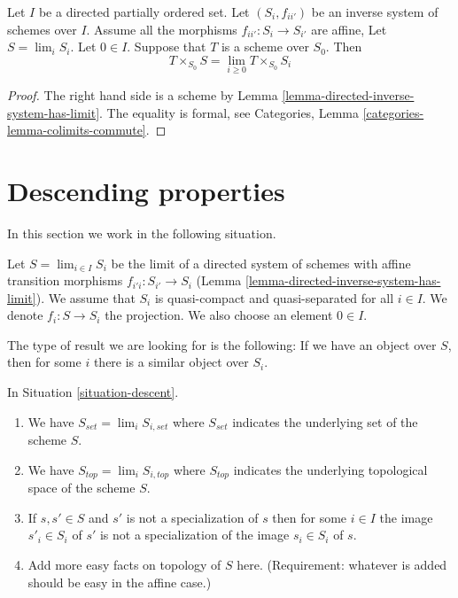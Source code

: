\begin{lemma}
\label{lemma-scheme-over-limit}
Let $I$ be a directed partially ordered set.
Let $(S_i, f_{ii'})$ be an inverse system of schemes over $I$.
Assume all the morphisms $f_{ii'} : S_i \to S_{i'}$ are affine,
Let $S = \lim_i S_i$. Let $0 \in I$.
Suppose that $T$ is a scheme over $S_0$.
Then
$$
T \times_{S_0} S = \lim_{i \geq 0} T \times_{S_0} S_i
$$
\end{lemma}

\begin{proof}
The right hand side is a scheme by
Lemma \ref{lemma-directed-inverse-system-has-limit}.
The equality is formal, see
Categories, Lemma \ref{categories-lemma-colimits-commute}.
\end{proof}







\section{Descending properties}
\label{section-descent}

\noindent
In this section we work in the following situation.

\begin{situation}
\label{situation-descent}
Let $S = \lim_{i \in I} S_i$ be the limit of a directed system of schemes
with affine transition morphisms $f_{i'i} : S_{i'} \to S_i$
(Lemma \ref{lemma-directed-inverse-system-has-limit}).
We assume that $S_i$ is quasi-compact and quasi-separated for all $i \in I$.
We denote $f_i : S \to S_i$ the projection.
We also choose an element $0 \in I$.
\end{situation}

\noindent
The type of result we are looking for is the following:
If we have an object over $S$, then for some $i$ there is a
similar object over $S_i$.

\begin{lemma}
\label{lemma-topology-limit}
In Situation \ref{situation-descent}.
\begin{enumerate}
\item We have $S_{set} = \lim_i S_{i, set}$ where $S_{set}$
indicates the underlying set of the scheme $S$.
\item We have $S_{top} = \lim_i S_{i, top}$ where $S_{top}$
indicates the underlying topological space of the scheme $S$.
\item If $s, s' \in S$ and $s'$ is not a specialization of $s$
then for some $i \in I$ the image $s'_i \in S_i$ of $s'$ is not
a specialization of the image $s_i \in S_i$ of $s$.
\item Add more easy facts on topology of $S$ here.
(Requirement: whatever is added should be easy in the affine case.)
\end{enumerate}
\end{lemma}

